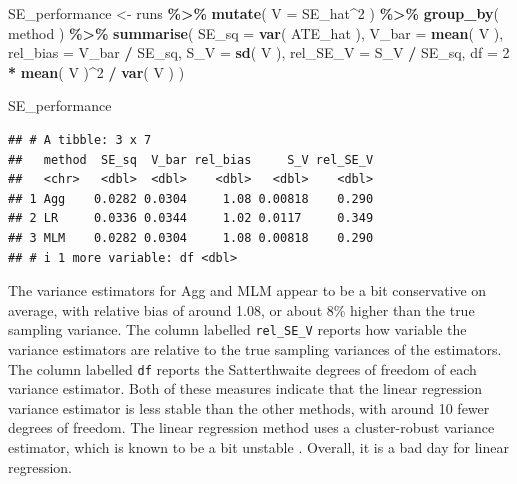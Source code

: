 \documentclass[
]{book}
\newenvironment{Shaded}{\begin{snugshade}}{\end{snugshade}}
\newcommand{\AttributeTok}[1]{\textcolor[rgb]{0.13,0.29,0.53}{#1}}
\newcommand{\DecValTok}[1]{\textcolor[rgb]{0.00,0.00,0.81}{#1}}
\newcommand{\FunctionTok}[1]{\textcolor[rgb]{0.13,0.29,0.53}{\textbf{#1}}}
\newcommand{\NormalTok}[1]{#1}
\newcommand{\OtherTok}[1]{\textcolor[rgb]{0.56,0.35,0.01}{#1}}
\newcommand{\SpecialCharTok}[1]{\textcolor[rgb]{0.81,0.36,0.00}{\textbf{#1}}}
\begin{document}
\begin{Shaded}
\begin{Highlighting}[]
\NormalTok{SE\_performance }\OtherTok{\textless{}{-}} 
\NormalTok{  runs }\SpecialCharTok{\%\textgreater{}\%}  
  \FunctionTok{mutate}\NormalTok{( }\AttributeTok{V =}\NormalTok{ SE\_hat}\SpecialCharTok{\^{}}\DecValTok{2}\NormalTok{ ) }\SpecialCharTok{\%\textgreater{}\%}
  \FunctionTok{group\_by}\NormalTok{( method ) }\SpecialCharTok{\%\textgreater{}\%}
  \FunctionTok{summarise}\NormalTok{( }
    \AttributeTok{SE\_sq =} \FunctionTok{var}\NormalTok{( ATE\_hat ),}
    \AttributeTok{V\_bar =} \FunctionTok{mean}\NormalTok{( V ),}
    \AttributeTok{rel\_bias =}\NormalTok{ V\_bar }\SpecialCharTok{/}\NormalTok{ SE\_sq,}
    \AttributeTok{S\_V =} \FunctionTok{sd}\NormalTok{( V ),}
    \AttributeTok{rel\_SE\_V =}\NormalTok{ S\_V }\SpecialCharTok{/}\NormalTok{ SE\_sq,}
    \AttributeTok{df =} \DecValTok{2} \SpecialCharTok{*} \FunctionTok{mean}\NormalTok{( V )}\SpecialCharTok{\^{}}\DecValTok{2} \SpecialCharTok{/} \FunctionTok{var}\NormalTok{( V )}
\NormalTok{  )}

\NormalTok{SE\_performance}
\end{Highlighting}
\end{Shaded}

\begin{verbatim}
## # A tibble: 3 x 7
##   method  SE_sq  V_bar rel_bias     S_V rel_SE_V
##   <chr>   <dbl>  <dbl>    <dbl>   <dbl>    <dbl>
## 1 Agg    0.0282 0.0304     1.08 0.00818    0.290
## 2 LR     0.0336 0.0344     1.02 0.0117     0.349
## 3 MLM    0.0282 0.0304     1.08 0.00818    0.290
## # i 1 more variable: df <dbl>
\end{verbatim}

The variance estimators for Agg and MLM appear to be a bit conservative on average, with relative bias of around 1.08, or about 8\% higher than the true sampling variance.
The column labelled \texttt{rel\_SE\_V} reports how variable the variance estimators are relative to the true sampling variances of the estimators.
The column labelled \texttt{df} reports the Satterthwaite degrees of freedom of each variance estimator.
Both of these measures indicate that the linear regression variance estimator is less stable than the other methods, with around 10 fewer degrees of freedom.
The linear regression method uses a cluster-robust variance estimator, which is known to be a bit unstable \citep{cameronPractitionerGuideClusterRobust2015}.
Overall, it is a bad day for linear regression.
\end{document}

